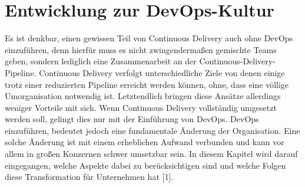 \section{Entwicklung zur DevOps-Kultur} \label{entwicklung}
Es ist denkbar, einen gewissen Teil von Continuous Delivery auch ohne DevOps einzuführen, denn hierfür muss es nicht zwingendermaßen gemischte Teams geben, sondern lediglich eine Zusammenarbeit an der Continuous-Delivery-Pipeline. Continuous Delivery verfolgt unterschiedliche Ziele von denen einige trotz einer reduzierten Pipeline erreicht werden können, ohne, dass eine völlige Umorganisation notwendig ist.
Letztendlich bringen diese Ansätze allerdings weniger Vorteile mit sich. Wenn Continuous Delivery vollständig umgesetzt werden soll, gelingt dies nur mit der Einführung von DevOps. DevOps einzuführen, bedeutet jedoch eine fundamentale Änderung der Organisation. Eine solche Änderung ist mit einem erheblichen Aufwand verbunden und kann vor allem in großen Konzernen schwer umsetzbar sein. In diesem Kapitel wird darauf eingegangen, welche Aspekte dabei zu berücksichtigen sind und welche Folgen diese Transformation für Unternehmen hat [1].

